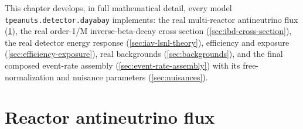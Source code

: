 \label{ch:detector-implementation}

This chapter develops, in full mathematical detail, every model
\texttt{tpeanuts.detector.dayabay} implements: the real multi-reactor
antineutrino flux (\cref{sec:flux-model}), the real order-1/M inverse-beta-decay
cross section (\cref{sec:ibd-cross-section}), the real detector energy
response (\cref{sec:iav-lsnl-theory}), efficiency and exposure
(\cref{sec:efficiency-exposure}), real backgrounds
(\cref{sec:backgrounds}), and the final composed event-rate assembly
(\cref{sec:event-rate-assembly}) with its free-normalization and nuisance
parameters (\cref{sec:nuisances}).

\section{Reactor antineutrino flux}
\label{sec:flux-model}


